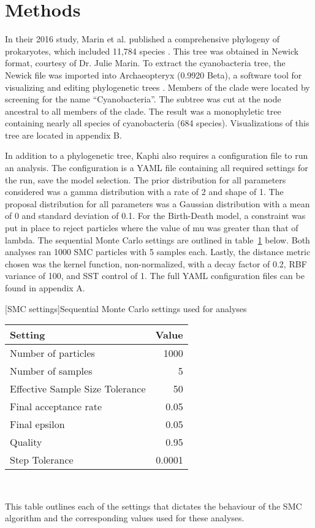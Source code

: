 \documentclass[12pt]{article}
\begin{document}
\section{ Methods}
	In their 2016 study, Marin et al. published a comprehensive phylogeny of prokaryotes, which included 11,784 species \cite{marin2016timetree}. This tree was obtained in Newick format, courtesy of Dr. Julie Marin. To extract the cyanobacteria tree, the Newick file was imported into Archaeopteryx (0.9920 Beta), a software tool for visualizing and editing phylogenetic trees \cite{han2009phyloxml}. Members of the clade were located by screening for the name “Cyanobacteria”. The subtree was cut at the node ancestral to all members of the clade. The result was a monophyletic tree containing nearly all species of cyanobacteria (684 species). Visualizations of this tree are located in appendix B.

	In addition to a phylogenetic tree, Kaphi also requires a configuration file to run an analysis. The configuration is a YAML file containing all required settings for the run, save the model selection. The prior distribution for all parameters considered was a gamma distribution with a rate of 2 and shape of 1. The proposal distribution for all parameters was a Gaussian distribution with a mean of 0 and standard deviation of 0.1. For the Birth-Death model, a constraint was put in place to reject particles where the value of mu was greater than that of lambda. The sequential Monte Carlo settings are outlined in table~\ref{1} below. Both analyses ran 1000 SMC particles with 5 samples each. Lastly, the distance metric chosen was the kernel function, non-normalized, with a decay factor of 0.2, RBF variance of 100, and SST control of 1. The full YAML configuration files can be found in appendix A.    
\\
\begin{table}[h!]
\centering
{}[SMC settings]{Sequential Monte Carlo settings used for analyses}
\begin{tabular}{l r}
    Setting & Value\\ \hline
    Number of particles & 1000\\
    Number of samples & 5\\
    Effective Sample Size Tolerance & 50\\
    Final acceptance rate & 0.05\\
    Final epsilon & 0.05\\
    Quality & 0.95\\
    Step Tolerance & 0.0001\\
\end{tabular}
\\
\begin{flushleft}This table outlines each of the settings that dictates the behaviour of the SMC algorithm and the corresponding values used for these analyses.\end{flushleft}
\label{1}
\end{table}
\end{document}
